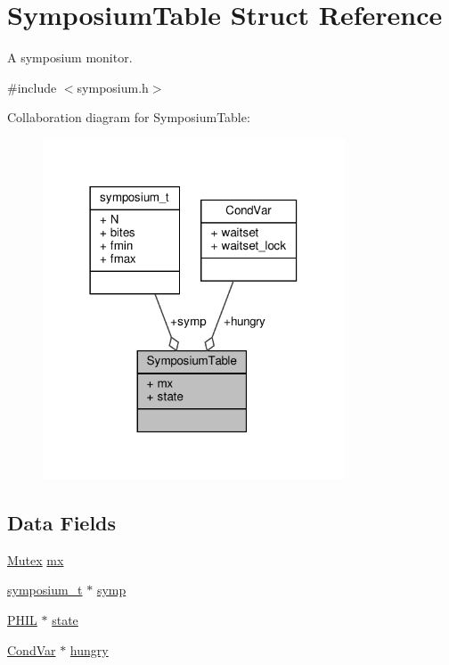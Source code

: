 \hypertarget{structSymposiumTable}{}\section{Symposium\+Table Struct Reference}
\label{structSymposiumTable}


A symposium monitor.  




{\ttfamily \#include $<$symposium.\+h$>$}



Collaboration diagram for Symposium\+Table\+:
\nopagebreak
\begin{figure}[H]
\begin{center}
\leavevmode
\includegraphics[width=254pt]{structSymposiumTable__coll__graph}
\end{center}
\end{figure}
\subsection*{Data Fields}
\begin{DoxyCompactItemize}
\item 
\hyperlink{group__syscalls_gaef2ec62cae8e0031fd19fc8b91083ade}{Mutex} \hyperlink{structSymposiumTable_a8c36f26f523e6b2f99f6e70fff098de8}{mx}
\item 
\hyperlink{structsymposium__t}{symposium\+\_\+t} $\ast$ \hyperlink{structSymposiumTable_a4089e2778ba23eb79c4785eb5702f70f}{symp}
\item 
\hyperlink{symposium_8h_a9fced5fb7d50a8fa2e8ae45b0cae3520}{P\+H\+IL} $\ast$ \hyperlink{structSymposiumTable_a70507f28df670d0db2e59fc65309af08}{state}
\item 
\hyperlink{structCondVar}{Cond\+Var} $\ast$ \hyperlink{structSymposiumTable_a6daa1fdbfe8e836e72bfd6953bc91f6e}{hungry}
\end{DoxyCompactItemize}


